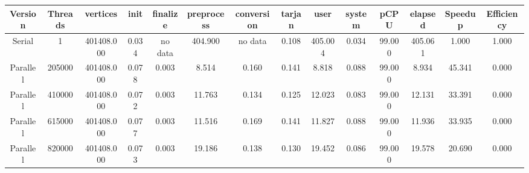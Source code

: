 \begin{tabular}{|c|c|c|c|c|c|c|c|c|c|c|c|c|c|}
\toprule
 Version &  Threads &   vertices &  init & finalize &  preprocess & conversion &  tarjan &    user &  system &   pCPU &  elapsed &  Speedup &  Efficiency \\
\midrule
  Serial &        1 & 401408.000 & 0.034 &  no data &     404.900 &    no data &   0.108 & 405.004 &   0.034 & 99.000 &  405.061 &    1.000 &       1.000 \\
Parallel &   205000 & 401408.000 & 0.078 &    0.003 &       8.514 &      0.160 &   0.141 &   8.818 &   0.088 & 99.000 &    8.934 &   45.341 &       0.000 \\
Parallel &   410000 & 401408.000 & 0.072 &    0.003 &      11.763 &      0.134 &   0.125 &  12.023 &   0.083 & 99.000 &   12.131 &   33.391 &       0.000 \\
Parallel &   615000 & 401408.000 & 0.077 &    0.003 &      11.516 &      0.169 &   0.141 &  11.827 &   0.088 & 99.000 &   11.936 &   33.935 &       0.000 \\
Parallel &   820000 & 401408.000 & 0.073 &    0.003 &      19.186 &      0.138 &   0.130 &  19.452 &   0.086 & 99.000 &   19.578 &   20.690 &       0.000 \\
\bottomrule
\end{tabular}

